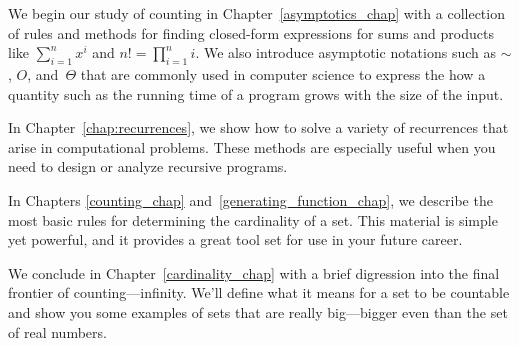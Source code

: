 
We begin our study of counting in Chapter~\ref{asymptotics_chap} with
a collection of rules and methods for finding closed-form expressions
for sums and products like $\sum_{i = 1}^n x^i$ and $n! =
\prod_{i=1}^n i$.  We also introduce asymptotic notations such as
$\sim$, $O$, and~$\Theta$ that are commonly used in computer science
to express the how a quantity such as the running time of a program
grows with the size of the input.

In Chapter~\ref{chap:recurrences}, we show how to solve a variety of
recurrences that arise in computational problems.  These methods are
especially useful when you need to design or analyze recursive
programs.

In Chapters \ref{counting_chap} and~\ref{generating_function_chap}, we
describe the most basic rules for determining the cardinality of a
set.  This material is simple yet powerful, and it provides a great
tool set for use in your future career.

We conclude in Chapter~\ref{cardinality_chap} with a brief digression
into the final frontier of counting---infinity.  We'll define what it
means for a set to be countable and show you some examples of sets
that are really big---bigger even than the set of real numbers.

\endinput
